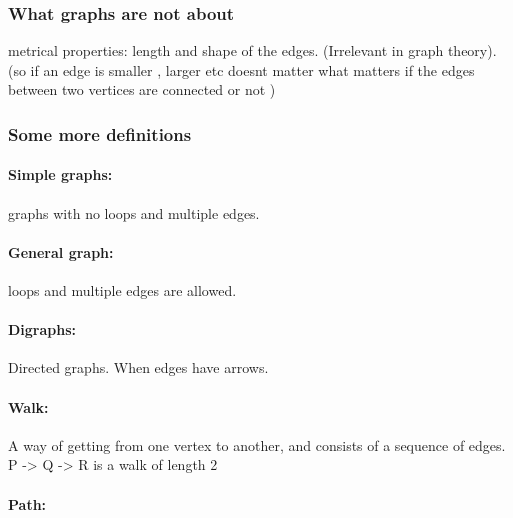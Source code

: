 \hypertarget{what-graphs-are-not-about}{%
\subsubsection{What graphs are not
about}\label{what-graphs-are-not-about}}

metrical properties: length and shape of the edges. (Irrelevant in graph
theory). (so if an edge is smaller , larger etc doesnt matter what
matters if the edges between two vertices are connected or not )

\hypertarget{some-more-definitions}{%
\subsubsection{Some more definitions}\label{some-more-definitions}}

\hypertarget{simple-graphs}{%
\paragraph{Simple graphs:}\label{simple-graphs}}

graphs with no loops and multiple edges.

\hypertarget{general-graph}{%
\paragraph{General graph:}\label{general-graph}}

loops and multiple edges are allowed.

\hypertarget{digraphs}{%
\paragraph{Digraphs:}\label{digraphs}}

Directed graphs. When edges have arrows.

\hypertarget{walk}{%
\paragraph{Walk:}\label{walk}}

A way of getting from one vertex to another, and consists of a sequence
of edges. P -\textgreater{} Q -\textgreater{} R is a walk of length 2

\hypertarget{path}{%
\paragraph{Path:}\label{path}}

